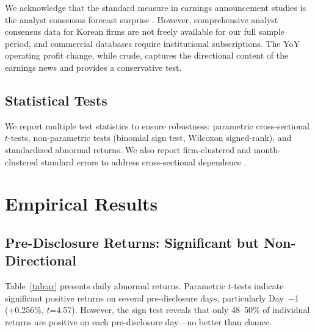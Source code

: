 \documentclass[manuscript,review]{acmart}
\begin{document}
We acknowledge that the standard measure in earnings announcement studies is the analyst consensus forecast surprise \cite{livnat2006comparing}. However, comprehensive analyst consensus data for Korean firms are not freely available for our full sample period, and commercial databases require institutional subscriptions. The YoY operating profit change, while crude, captures the directional content of the earnings news and provides a conservative test.

\subsection{Statistical Tests}

We report multiple test statistics to ensure robustness: parametric cross-sectional $t$-tests, non-parametric tests (binomial sign test, Wilcoxon signed-rank), and standardized abnormal returns. We also report firm-clustered and month-clustered standard errors to address cross-sectional dependence \cite{kolari2010event}.

\section{Empirical Results}

\subsection{Pre-Disclosure Returns: Significant but Non-Directional}

Table~\ref{tab:ar} presents daily abnormal returns. Parametric $t$-tests indicate significant positive returns on several pre-disclosure days, particularly Day~$-$1 (+0.256\%, $t$=4.57). However, the sign test reveals that only 48--50\% of individual returns are positive on each pre-disclosure day---no better than chance.
\end{document}
